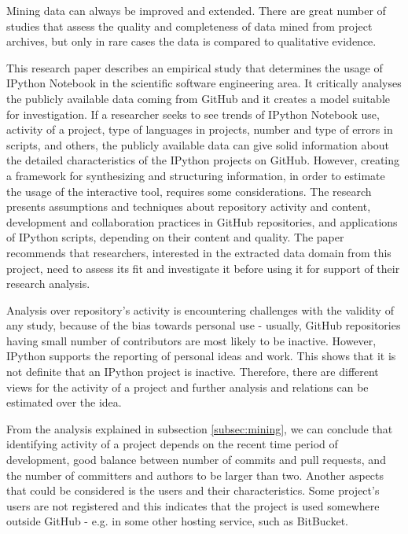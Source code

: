 Mining data can always be improved and extended. There are great number of studies that assess the quality and completeness of data mined from project archives, but only in rare cases the data is compared to qualitative evidence\cite{aranda2009secret}\cite{kalliamvakoupromises}. 

This research paper describes an empirical study that determines the usage of IPython Notebook in the scientific software engineering area. It critically analyses the publicly available data coming from GitHub\cite{gitHubWiki} and it creates a model suitable for investigation. If a researcher seeks to see trends of IPython Notebook use, activity of a project, type of languages in projects, number and type of errors in scripts, and others,
the publicly available data can give solid information about the detailed
characteristics of the IPython projects on GitHub. However, creating a framework for synthesizing and structuring information, in order to estimate the usage of the interactive tool, requires some considerations. The research presents assumptions and techniques about repository activity and content, development and collaboration practices in GitHub repositories, and applications of IPython scripts, depending on their content and quality. The paper recommends that researchers, interested in the extracted data domain from this project, need to assess its fit and investigate it before using it for support of their research analysis.

Analysis over repository's activity is encountering challenges with the validity of any study, because of the bias towards personal use - usually, GitHub repositories having small number of contributors are most likely to be inactive. However, IPython supports the reporting of personal ideas and work. This shows that it is not definite that an IPython project is inactive. Therefore, there are different views for the activity of a project and further analysis and relations can be estimated over the idea.

From the analysis explained in subsection \ref{subsec:mining}, we can conclude that identifying activity of a project depends on the recent time period of development, good balance between number of commits and pull requests, and the number of committers and authors to be larger than two. Another aspects that could be considered is the users and their characteristics. Some project's users are not registered and this indicates that the project is used somewhere outside GitHub - e.g. in some other hosting service, such as BitBucket\cite{bitBucket}.

